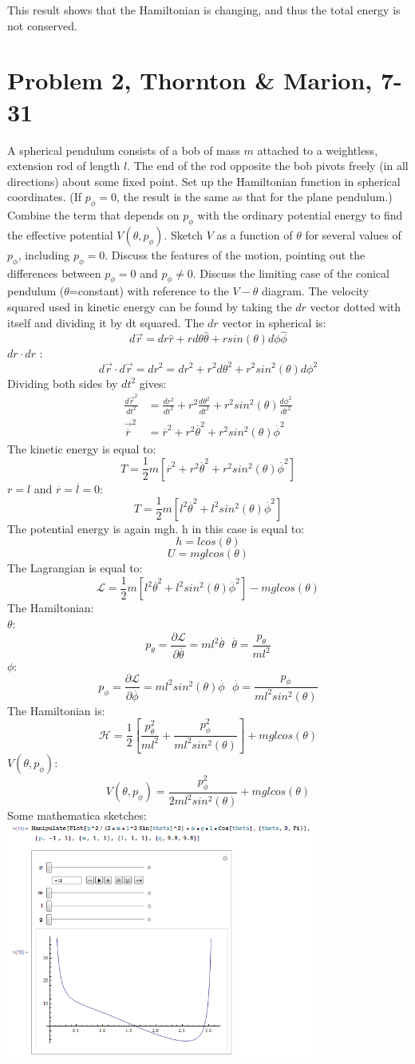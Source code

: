 \documentclass[a4paper,12pt]{article}
\newcommand{\V}[1]{\ensuremath{\vec{#1}}}
\newcommand{\F}[2]{\ensuremath{\frac{#1}{#2}}}
\newcommand{\Q}[1]{\newpage \section*{#1}}
\newcommand{\vel}[1]{\overset{.}{#1}}
\newcommand{\prt}[2]{\frac{\partial#1}{\partial#2}}
\begin{document}
This result shows that the Hamiltonian is changing, and thus the total energy is not conserved.
\Q{Problem 2, Thornton \& Marion, 7-31}
A spherical pendulum consists of a bob of mass $m$ attached to a weightless, extension rod of length $l$. The end of the rod opposite the bob pivots freely (in all directions) about some fixed point. Set up the Hamiltonian function in spherical coordinates.  (If $p_\phi=0$, the result is the same as that for the plane pendulum.)  Combine the term that depends on $p_\phi$ with the ordinary potential energy to find the effective potential $V(\theta,p_\phi)$.  Sketch $V$ as a function of $\theta$ for several values of $p_\phi$, including $p_\phi=0$. Discuss the features of the motion, pointing out the differences between $p_\phi=0$ and $p_\phi\ne0$. Discuss the limiting case of the conical pendulum ($\theta$=constant) with reference to the $V-\theta$ diagram.
The velocity squared used in kinetic energy can be found by taking the $dr$ vector dotted with itself and dividing it by dt squared.  The $dr$ vector in spherical is:
\[d\V{r}=dr\hat{r}+rd\theta\hat{\theta}+rsin(\theta)d\phi\hat{\phi}\]
$dr\cdot dr$ :
\[d\V{r}\cdot d\V{r}=dr^2=dr^2+r^2d\theta^2+r^2sin^2(\theta)d\phi^2\]
Dividing both sides by $dt^2$ gives:
\begin{align*}
\F{d\V{r}^2}{dt^2}&=\F{dr^2}{dt^2}+r^2\F{d\theta^2}{dt^2}+r^2sin^2(\theta)\F{d\phi^2}{dt^2}\\
\V{\vel{r}}^2&=\vel{r}^2+r^2\vel{\theta}^2+r^2sin^2(\theta)\vel{\phi}^2
\end{align*}
The kinetic energy is equal to:
\[T=\F{1}{2}m[\vel{r}^2+r^2\vel{\theta}^2+r^2sin^2(\theta)\vel{\phi}^2]\]
$r=l$ and $\vel{r}=\vel{l}=0$:
\[T=\F{1}{2}m[l^2\vel{\theta}^2+l^2sin^2(\theta)\vel{\phi}^2]\]
The potential energy is again mgh.  h in this case is equal to:
\[h=lcos(\theta)\]
\[U=mglcos(\theta)\]
The Lagrangian is equal to:
\[\mathcal{L}=\F{1}{2}m[l^2\vel{\theta}^2+l^2sin^2(\theta)\vel{\phi}^2]-mglcos(\theta)\]
The Hamiltonian:\\
$\theta$:
\[p_\theta=\prt{\mathcal{L}}{\vel{\theta}}=ml^2\vel{\theta}~~~\vel{\theta}=\F{p_\theta}{ml^2}\]
$\phi$:
\[p_\phi=\prt{\mathcal{L}}{\vel{\phi}}=ml^2sin^2(\theta)\vel{\phi}~~~\vel{\phi}=\F{p_\phi}{ml^2sin^2(\theta)}\]
The Hamiltonian is:
\[\mathcal{H}=\F{1}{2}\left[\F{p_\theta^2}{ml^2}+\F{p_\phi^2}{ml^2sin^2(\theta)}\right]+mglcos(\theta)\]
$V(\theta,p_\phi)$:
\[V(\theta,p_\phi)=\F{p_\phi^2}{2ml^2sin^2(\theta)}+mglcos(\theta)\]
Some mathematica sketches:\\
\includegraphics[width=4in]{negative_p.png}\\
\end{document}
